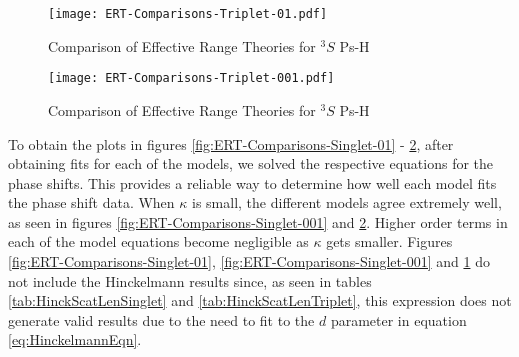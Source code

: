 \documentclass[Dissertation.tex]{subfiles}
\begin{document}
\begin{figure}[H]
	\centering
	\texttt{[image: ERT-Comparisons-Triplet-01.pdf]}
	\caption{Comparison of Effective Range Theories for $^3S$ Ps-H}
	\label{fig:ERT-Comparisons-Triplet-01}
\end{figure}

\begin{figure}[H]
	\centering
	\texttt{[image: ERT-Comparisons-Triplet-001.pdf]}
	\caption{Comparison of Effective Range Theories for $^3S$ Ps-H}
	\label{fig:ERT-Comparisons-Triplet-001}
\end{figure}

To obtain the plots in figures \ref{fig:ERT-Comparisons-Singlet-01} - \ref{fig:ERT-Comparisons-Triplet-001}, after obtaining fits for each of the models, we solved the respective equations for the phase shifts.  This provides a reliable way to determine how well each model fits the phase shift data. When $\kappa$ is small, the different models agree extremely well, as seen in figures \ref{fig:ERT-Comparisons-Singlet-001} and \ref{fig:ERT-Comparisons-Triplet-001}. Higher order terms in each of the model equations become negligible as $\kappa$ gets smaller. Figures \ref{fig:ERT-Comparisons-Singlet-01}, \ref{fig:ERT-Comparisons-Singlet-001} and \ref{fig:ERT-Comparisons-Triplet-01} do not include the Hinckelmann results since, as seen in tables \ref{tab:HinckScatLenSinglet} and \ref{tab:HinckScatLenTriplet}, this expression does not generate valid results due to the need to fit to the $d$ parameter in equation \ref{eq:HinckelmannEqn}.
\end{document}
